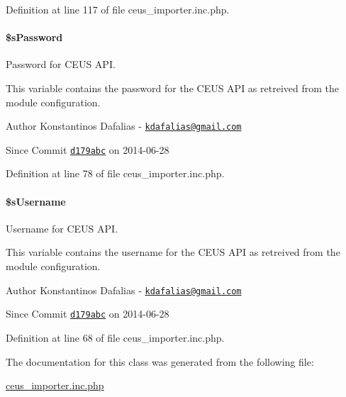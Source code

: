 Definition at line 117 of file ceus\+\_\+importer.\+inc.\+php.

\hypertarget{classceus__importer_aa0e0dca3ea68cd00d0e474f28887afdd}{
\paragraph[{\$s\+Password}]{\setlength{\rightskip}{0pt plus 5cm}\$s\+Password\hspace{0.3cm}{\ttfamily [private]}}}\label{classceus__importer_aa0e0dca3ea68cd00d0e474f28887afdd}


Password for C\+E\+U\+S A\+P\+I. 

This variable contains the password for the C\+E\+U\+S A\+P\+I as retreived from the module configuration.

\begin{DoxyAuthor}{Author}
Konstantinos Dafalias -\/ \href{mailto:kdafalias@gmail.com}{\tt kdafalias@gmail.\+com} 
\end{DoxyAuthor}
\begin{DoxySince}{Since}
Commit \href{http://github.com/TheJake123/DrupalModul/commit/d179abcc5e05743086cd67cf1ce30b08923a7183}{\tt d179abc} on 2014-\/06-\/28 
\end{DoxySince}


Definition at line 78 of file ceus\+\_\+importer.\+inc.\+php.

\hypertarget{classceus__importer_a6a8bb67b9b483c3389abcd78c451ff57}{
\paragraph[{\$s\+Username}]{\setlength{\rightskip}{0pt plus 5cm}\$s\+Username\hspace{0.3cm}{\ttfamily [private]}}}\label{classceus__importer_a6a8bb67b9b483c3389abcd78c451ff57}


Username for C\+E\+U\+S A\+P\+I. 

This variable contains the username for the C\+E\+U\+S A\+P\+I as retreived from the module configuration.

\begin{DoxyAuthor}{Author}
Konstantinos Dafalias -\/ \href{mailto:kdafalias@gmail.com}{\tt kdafalias@gmail.\+com} 
\end{DoxyAuthor}
\begin{DoxySince}{Since}
Commit \href{http://github.com/TheJake123/DrupalModul/commit/d179abcc5e05743086cd67cf1ce30b08923a7183}{\tt d179abc} on 2014-\/06-\/28 
\end{DoxySince}


Definition at line 68 of file ceus\+\_\+importer.\+inc.\+php.



The documentation for this class was generated from the following file\+:\begin{DoxyCompactItemize}
\item 
\hyperlink{ceus__importer_8inc_8php}{ceus\+\_\+importer.\+inc.\+php}\end{DoxyCompactItemize}
